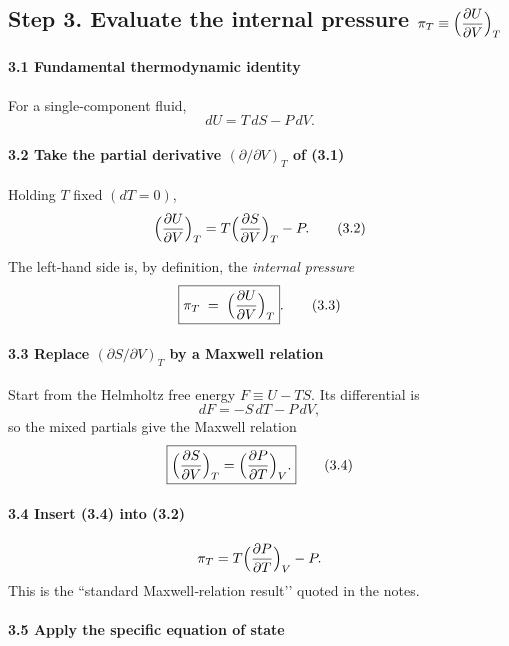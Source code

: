 \documentclass[12pt]{article}
\theoremstyle{definition} %
\theoremstyle{plain} %
\begin{document}
\subsection*{Step 3.  Evaluate the internal pressure
            $\displaystyle\pi_{T}\equiv
            \Bigl(\frac{\partial U}{\partial V}\Bigr)_{T}$}

\paragraph{3.1 Fundamental thermodynamic identity}

For a single‑component fluid,
\[
dU = T\,dS - P\,dV.
\tag{3.1}
\]

\paragraph{3.2 Take the partial derivative $(\partial/\partial V)_{T}$ of (3.1)}

Holding \(T\) fixed \((dT=0)\),
\[
\Bigl(\frac{\partial U}{\partial V}\Bigr)_{T}
  = T\Bigl(\frac{\partial S}{\partial V}\Bigr)_{T} - P.
\tag{3.2}
\]

The left‑hand side is, by definition, the
\emph{internal pressure}
\[
\boxed{\pi_{T} \;=\;
       \Bigl(\frac{\partial U}{\partial V}\Bigr)_{T}}.
\tag{3.3}
\]

\paragraph{3.3 Replace $\displaystyle(\partial S/\partial V)_{T}$
          by a Maxwell relation}

Start from the Helmholtz free energy
\(F\equiv U-TS\).  
Its differential is
\[
dF = -S\,dT - P\,dV,
\]
so the mixed partials give the Maxwell relation
\[
\boxed{\Bigl(\frac{\partial S}{\partial V}\Bigr)_{T}
       = \Bigl(\frac{\partial P}{\partial T}\Bigr)_{V}.}
\tag{3.4}
\]

\paragraph{3.4 Insert (3.4) into (3.2)}

\[
\pi_{T}
  = T\Bigl(\frac{\partial P}{\partial T}\Bigr)_{V} - P.
\]
This is the “standard Maxwell‑relation result’’ quoted in the notes.

\paragraph{3.5 Apply the specific equation of state}
\end{document}
